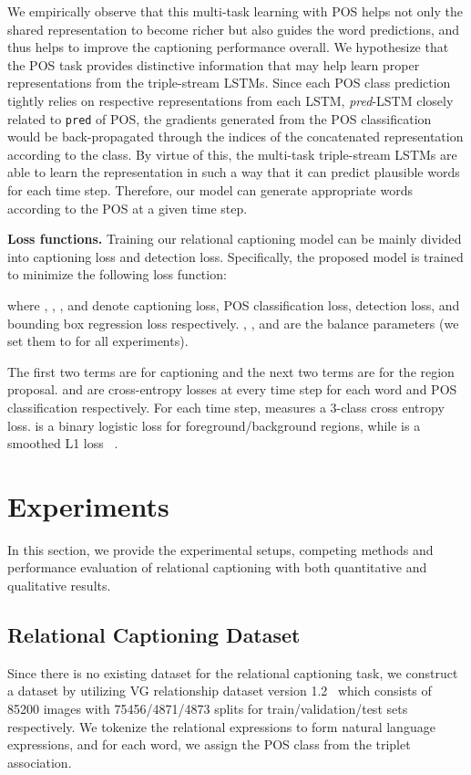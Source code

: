 \documentclass[10pt,twocolumn,letterpaper]{article}
\begin{document}
We empirically observe that this multi-task learning with POS helps not only the shared representation to become richer but also guides the  word predictions, and thus helps to improve the captioning performance overall. 
We hypothesize that the POS task provides distinctive information that may help learn proper representations from the triple-stream LSTMs.
Since each POS class prediction tightly relies on respective representations from each LSTM, \eg \emph{pred}-LSTM closely related to \texttt{pred} of POS, the gradients generated from the POS classification would be {back-propagated} through the indices of the concatenated representation according to the class.
By virtue of this, the multi-task triple-stream LSTMs are able to learn the representation in such a way that it can predict plausible words for each time step.
{Therefore,} our model can generate appropriate words according to the POS at a given time step.


\noindent\textbf{Loss functions.}\quad
Training our relational captioning model can be mainly divided into captioning loss and detection loss. 
Specifically, the proposed model is trained to minimize the following loss function:

where , , , and  denote captioning loss, POS classification loss, detection loss, and bounding box regression loss respectively.
, , and  are the balance parameters (we set them to  for all experiments). 

The first two terms are for captioning and the next two terms are for the region proposal.
 and  are cross-entropy losses at every time step for each word and POS classification respectively. 
For each time step,  measures a 3-class cross entropy loss.
 is a binary logistic loss for foreground/background regions, while  is a smoothed L1 loss ~\cite{ren2015faster}. 
 
\section{Experiments}


In this section, we provide the experimental setups, competing methods and performance evaluation of relational captioning with both quantitative and qualitative results.
\subsection{Relational Captioning Dataset}

{Since there is no existing dataset for the relational captioning task, we construct a dataset by utilizing VG relationship dataset version 1.2~\cite{krishna2017visual} which consists of 85200 images with 75456/4871/4873 splits for train/validation/test sets respectively.
We tokenize the relational expressions to form natural language expressions, and for each word, we assign the POS class from the triplet association.
}
\end{document}
